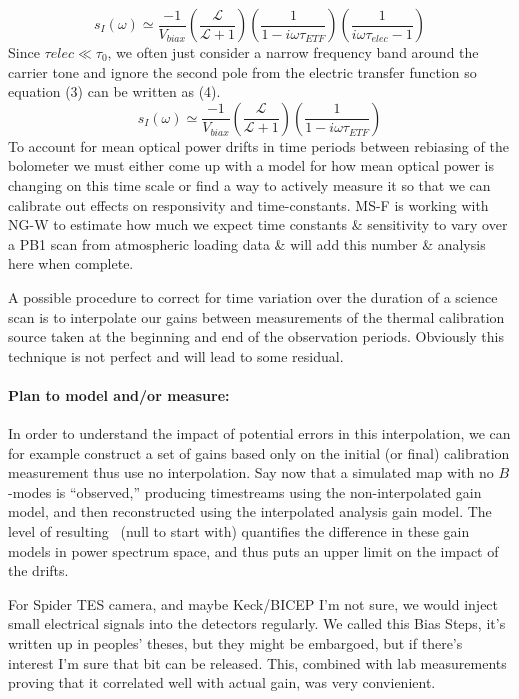 \begin{equation}
s_I(\omega) \simeq \frac{-1}{V_{biax}}\left(\frac{\mathcal{L}}{\mathcal{L}+1}\right)\left(\frac{1}{1-i\omega\tau_{ETF}}\right)\left(\frac{1}{i\omega\tau_{elec}-1}\right)
\end{equation}
Since $\tau{elec} \ll \tau_0$, we often just consider a narrow frequency band around the carrier tone and ignore the second pole from the electric transfer function so equation (3) can be written as (4).
\begin{equation}
s_I(\omega) \simeq \frac{-1}{V_{biax}}\left(\frac{\mathcal{L}}{\mathcal{L}+1}\right)\left(\frac{1}{1-i\omega\tau_{ETF}}\right)
\end{equation}
To account for mean optical power drifts in time periods between rebiasing of the bolometer we must either come up with a model for how mean optical power is changing on this time scale or find a way to actively measure it so that we can calibrate out effects on responsivity and time-constants. MS-F is working with NG-W to estimate how much we expect time constants \& sensitivity to vary over a PB1 scan from atmospheric loading data \& will add this number \& analysis here when complete.

A possible procedure to correct for time variation over the duration of a science scan is to interpolate our gains between measurements of the thermal calibration source taken at the beginning and end of the observation periods.
Obviously this technique is not perfect and will lead to some residual.

\paragraph{Plan to model and/or measure:}
In order to understand the impact of potential errors in this interpolation, we can for example construct a set of gains based only on the initial (or final) calibration measurement thus use no interpolation.
Say now that a simulated map with no $B$-modes is ``observed,'' producing timestreams using the non-interpolated gain model, and then reconstructed using the interpolated analysis gain model. 
The level of resulting \clbb\ (null to start with) quantifies the difference in these gain models in power spectrum space, and thus puts an upper limit on the impact of the drifts.

For Spider TES camera, and maybe Keck/BICEP I'm not sure, we would inject small electrical signals into the detectors regularly. We called this Bias Steps, it's written up in peoples' theses, but they might be embargoed, but if there's interest I'm sure that bit can be released. This, combined with lab measurements proving that it correlated well with actual gain, was very convienient.

